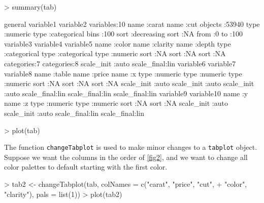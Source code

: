 \documentclass[11pt, fleqn, a4paper]{article}
\begin{document}
\begin{Schunk}
\begin{Sinput}
> summary(tab)
\end{Sinput}
\begin{Soutput}
      general            variable1               variable2          
 variables:10      name       :carat        name      :cut          
 objects  :53940   type       :numeric      type      :categorical  
 bins     :100     sort       :decreasing   sort      :NA           
 from     :0%      scale_init :auto         categories:6            
 to       :100%    scale_final:lin                                  
      variable3                variable4                 variable5      
 name      :color         name      :clarity       name       :depth    
 type      :categorical   type      :categorical   type       :numeric  
 sort      :NA            sort      :NA            sort       :NA       
 categories:7             categories:8             scale_init :auto     
                                                   scale_final:lin      
       variable6             variable7             variable8      
 name       :table     name       :price     name       :x        
 type       :numeric   type       :numeric   type       :numeric  
 sort       :NA        sort       :NA        sort       :NA       
 scale_init :auto      scale_init :auto      scale_init :auto     
 scale_final:lin       scale_final:lin       scale_final:lin      
       variable9             variable10     
 name       :y         name       :z        
 type       :numeric   type       :numeric  
 sort       :NA        sort       :NA       
 scale_init :auto      scale_init :auto     
 scale_final:lin       scale_final:lin      
\end{Soutput}
\begin{Sinput}
> plot(tab)
\end{Sinput}
\end{Schunk}

The function {\tt changeTabplot} is used to make minor changes to a {\tt tabplot} object. Suppose we want the columns in the order of \ref{fig2}, and we want to change all color palettes to default starting with the first color.

\begin{Schunk}
\begin{Sinput}
> tab2 <- changeTabplot(tab, colNames = c("carat", "price", "cut", 
+     "color", "clarity"), pals = list(1))
> plot(tab2)
\end{Sinput}
\end{Schunk}
\end{document}
